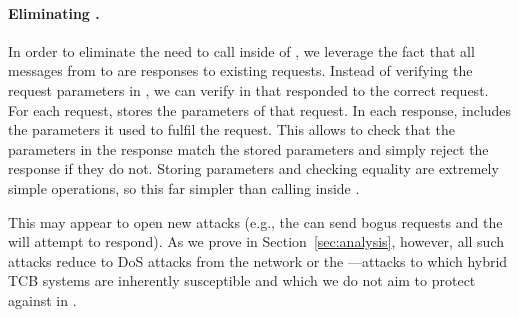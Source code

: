\paragraph{Eliminating \oauth.}
In order to eliminate the need to call \oauth inside of \tcboff, we leverage the fact that all messages from \tcboff to \tcbon are responses to existing requests.
Instead of verifying the request parameters in \tcboff, we can verify in \tcbon that \tcboff responded to the correct request.
For each request, \tcbon stores the parameters of that request.
In each response, \tcboff includes the parameters it used to fulfil the request.
This allows \tcbon to check that the parameters in the response match the stored parameters
and simply reject the response if they do not.
Storing parameters and checking equality are extremely simple operations, so this far simpler than calling \oauth inside \tcboff.

This may appear to open new attacks (e.g., the \medname can send bogus requests and the \tcboff will attempt to respond).
As we prove in Section~\ref{sec:analysis}, however, all such attacks reduce to DoS attacks from the network or the \medname---attacks to which hybrid TCB systems are inherently susceptible and which we do not aim to protect against in \tc.


